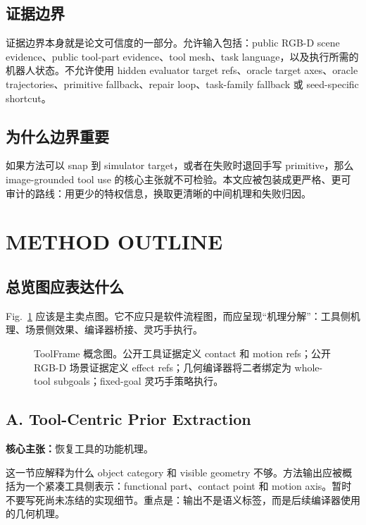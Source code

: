 \documentclass[letterpaper, 10 pt, conference]{ieeeconf}
\newcommand{\method}{ToolFrame}
\newcommand{\claim}[1]{\textbf{核心主张：}#1}
\begin{document}
\subsection{证据边界}
证据边界本身就是论文可信度的一部分。允许输入包括：public RGB-D scene evidence、public tool-part evidence、tool mesh、task language，以及执行所需的机器人状态。不允许使用 hidden evaluator target refs、oracle target axes、oracle trajectories、primitive fallback、repair loop、task-family fallback 或 seed-specific shortcut。

\subsection{为什么边界重要}
如果方法可以 snap 到 simulator target，或者在失败时退回手写 primitive，那么 image-grounded tool use 的核心主张就不可检验。本文应被包装成更严格、更可审计的路线：用更少的特权信息，换取更清晰的中间机理和失败归因。

\section{METHOD OUTLINE}

\subsection{总览图应表达什么}
Fig.~\ref{fig:overview} 应该是主卖点图。它不应只是软件流程图，而应呈现“机理分解”：工具侧机理、场景侧效果、编译器桥接、灵巧手执行。

\begin{figure}[t]
\centering
{}
\caption{\method{} 概念图。公开工具证据定义 contact 和 motion refs；公开 RGB-D 场景证据定义 effect refs；几何编译器将二者绑定为 whole-tool subgoals；fixed-goal 灵巧手策略执行。}
\label{fig:overview}
\end{figure}

\subsection{A. Tool-Centric Prior Extraction}
\claim{恢复工具的功能机理。}

这一节应解释为什么 object category 和 visible geometry 不够。方法输出应被概括为一个紧凑工具侧表示：functional part、contact point 和 motion axis。暂时不要写死尚未冻结的实现细节。重点是：输出不是语义标签，而是后续编译器使用的几何机理。
\end{document}
